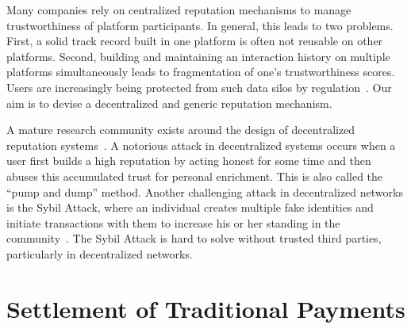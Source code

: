 Many companies rely on centralized reputation mechanisms to manage trustworthiness of platform participants.
In general, this leads to two problems.
First, a solid track record built in one platform is often not reusable on other platforms.
Second, building and maintaining an interaction history on multiple platforms simultaneously leads to fragmentation of one's trustworthiness scores.
Users are increasingly being protected from such data silos by regulation~\cite{koops2014trouble}.
Our aim is to devise a decentralized and generic reputation mechanism. %

A mature research community exists around the design of decentralized reputation systems~\cite{delaviz2012sybilres}\cite{kamvar2003eigentrust}\cite{srivatsa2005trustguard}.
A notorious attack in decentralized systems occurs when a user first builds a high reputation by acting honest for some time and then abuses this accumulated trust for personal enrichment.
This is also called the \enquote{pump and dump} method.
Another challenging attack in decentralized networks is the Sybil Attack, where an individual creates multiple fake identities and initiate transactions with them to increase his or her standing in the community~\cite{douceur2002sybil}.
The Sybil Attack is hard to solve without trusted third parties, particularly in decentralized networks.


\section{Settlement of Traditional Payments}

